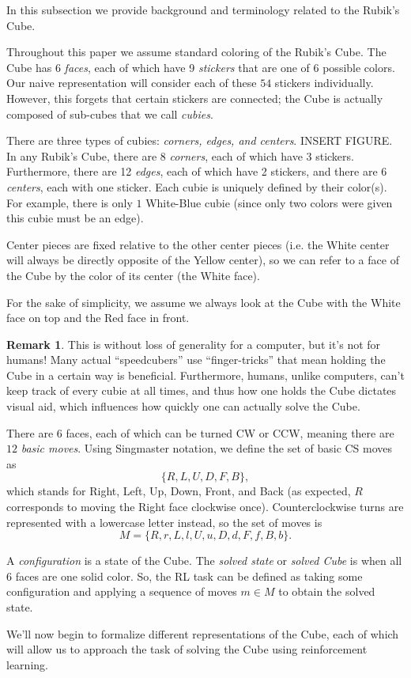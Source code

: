 \documentclass[12pt,oneside,oldfontcommands]{memoir}
\theoremstyle{definition}
\newtheorem{remark}{Remark}
\begin{document}
\begin{Subsection}
In this subsection we provide background and terminology related to the Rubik's Cube. 
\tcblower

Throughout this paper we assume standard coloring of the Rubik's Cube. The Cube has 6 \textit{faces}, each of which have 9 \textit{stickers} that are one of 6 possible colors. Our naive representation will consider each of these $54$ stickers individually. However, this forgets that certain stickers are connected; the Cube is actually composed of sub-cubes that we call \textit{cubies}. 


There are three types of cubies: \textit{corners, edges, and centers}. INSERT FIGURE. In any Rubik's Cube, there are 8 \textit{corners}, each of which have 3 stickers. Furthermore, there are 12 \textit{edges}, each of which have 2 stickers, and there are 6 \textit{centers}, each with one sticker. Each cubie is uniquely defined by their color(s). For example, there is only $1$ White-Blue cubie (since only two colors were given this cubie must be an edge). 


Center pieces are fixed relative to the other center pieces (i.e. the White center will always be directly opposite of the Yellow center), so we can refer to a face of the Cube by the color of its center (the White face). 


For the sake of simplicity, we assume we always look at the Cube with the White face on top and the Red face in front.

\begin{remark}
This is without loss of generality for a computer, but it's not for humans! Many actual ``speedcubers'' use ``finger-tricks'' that mean holding the Cube in a certain way is beneficial. Furthermore, humans, unlike computers, can't keep track of every cubie at all times, and thus how one holds the Cube dictates visual aid, which influences how quickly one can actually solve the Cube. 
\end{remark}


There are $6$ faces, each of which can be turned CW or CCW, meaning there are $12$ \textit{basic moves}. Using Singmaster notation, we define the set of basic CS moves as $$\{R, L, U, D, F, B\},$$ which stands for Right, Left, Up, Down, Front, and Back (as expected, $R$ corresponds to moving the Right face clockwise once). Counterclockwise turns are represented with a lowercase letter instead, so the set of moves is $$M = \{R,r,L,l,U,u,D,d,F,f,B,b\}.$$


A \textit{configuration} is a state of the Cube. The \textit{solved state} or \textit{solved Cube} is when all 6 faces are one solid color. So, the RL task can be defined as taking some configuration and applying a sequence of moves $m \in M$ to obtain the solved state. 

We'll now begin to formalize different representations of the Cube, each of which will allow us to approach the task of solving the Cube using reinforcement learning. 
\end{Subsection}

\begin{Subsection}

\tcblower


\end{Subsection}
\end{document}
